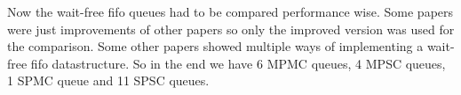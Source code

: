 Now the wait-free fifo queues had to be compared performance wise. Some papers were just improvements of other papers so only the improved version was used for the comparison. Some other papers showed multiple ways of implementing a wait-free fifo datastructure. So in the end we have 6 \ac{MPMC} queues, 4 \ac{MPSC} queues, 1 \ac{SPMC} queue and 11 \ac{SPSC} queues.
